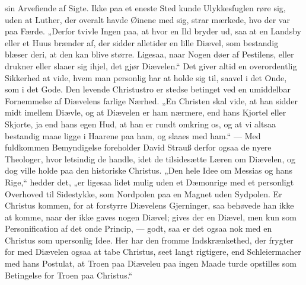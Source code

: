 \documentclass[12pt,a4paper]{book}
\begin{document}
sin Arvefiende af Sigte. Ikke paa et eneste Sted kunde Ulykkesfuglen røre sig, uden at
Luther, der overalt havde Øinene med sig, strar mærkede, hvo der var paa Færde. „Derfor
tvivle Ingen paa, at hvor en Ild bryder ud, saa at en Landsby eller et Huus brænder af,
der sidder alletider en lille Diævel, som bestandig blæser deri, at den kan blive større.
Ligesaa, naar Nogen døer af Pestilens, eller drukner eller slaaer sig ihjel, det gjør
Diævelen.“ Det giver altid en overordentlig Sikkerhed at vide, hvem man personlig har at
holde sig til, saavel i det Onde, som i det Gode. Den levende Christustro er stedse
betinget ved en umiddelbar Fornemmelse af Diævelens farlige Nærhed. „En Christen skal
vide, at han sidder midt imellem Diævle, og at Diævelen er ham nærmere, end hans Kjortel
eller Skjorte, ja end hans egen Hud, at han er rundt omkring os, og at vi altsaa bestandig
maae ligge i Haarene paa ham, og slaaes med ham.“ --- Med fuldkommen Bemyndigelse
foreholder David Strauß derfor ogsaa de nyere Theologer, hvor letsindig de handle, idet de
tilsidesætte Læren om Diævelen, og dog ville holde paa den historiske Christus. „Den hele
Idee om Messias og hans Rige,“ hedder det, „er ligesaa lidet mulig uden et Dæmonrige med
et personligt Overhoved til Sidestykke, som Nordpolen paa en Magnet uden Sydpolen. Er
Christus kommen, for at forstyrre Diævelens Gjerninger, saa behøvede han ikke at komme,
naar der ikke gaves nogen Diævel; gives der en Diævel, men kun som Personification af det
onde Princip, --- godt, saa er
det ogsaa nok med en Christus som upersonlig Idee. Her har den fromme Indskrænkethed, der
frygter for med Diævelen ogsaa at tabe Christus, seet langt rigtigere, end Schleiermacher
med hans Postulat, at Troen paa Diæveleu paa ingen Maade turde opstilles som Betingelse
for Troen paa Christus.“
\end{document}
